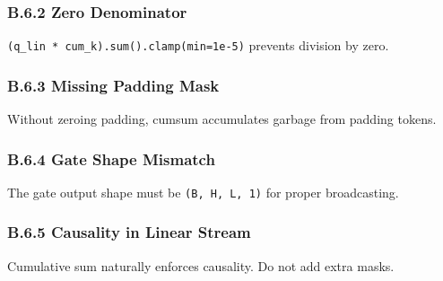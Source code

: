 \subsubsection{B.6.2 Zero Denominator}

\texttt{(q\_lin * cum\_k).sum().clamp(min=1e-5)} prevents division by zero.

\subsubsection{B.6.3 Missing Padding Mask}

Without zeroing padding, cumsum accumulates garbage from padding tokens.

\subsubsection{B.6.4 Gate Shape Mismatch}

The gate output shape must be \texttt{(B, H, L, 1)} for proper broadcasting.

\subsubsection{B.6.5 Causality in Linear Stream}

Cumulative sum naturally enforces causality. Do not add extra masks.